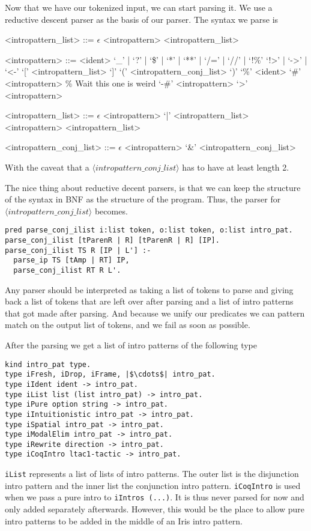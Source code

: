 \documentclass[thesis.tex]{subfiles}
\begin{document}
{{{Now that we have our tokenized input, we can start parsing it. We use a reductive descent parser as the basis of our parser. The syntax we parse is
\begin{grammar}
  <intropattern\_list> ::= $\epsilon$
  \alt <intropattern> <intropattern\_list>

  <intropattern> ::= <ident>
  \alt `_' | `?' | `\$' | `*' | `**' | `/=' | `//' | `!\%'
  \alt `!>' | `->' | `<-'
  \alt `[' <intropattern\_list> `]'
  \alt `(' <intropattern\_conj\_list> `)'
  \alt `\%' <ident>
  \alt `#' <intropattern> \% Wait this one is weird
  \alt `-#' <intropattern>
  \alt `>' <intropattern>

  <intropattern\_list> ::= $\epsilon$
  \alt <intropattern> `|' <intropattern\_list>
  \alt <intropattern> <intropattern\_list>

  <intropattern\_conj\_list> ::= $\epsilon$
  \alt <intropattern> `&' <intropattern\_conj\_list>
\end{grammar}
With the caveat that a $\langle intropattern\_conj\_list\rangle$ has to have at least length 2.

The nice thing about reductive decent parsers, is that we can keep the structure of the syntax in BNF as the structure of the program. Thus, the parser for $\langle intropattern\_conj\_list\rangle$ becomes.
\begin{verbatim}
pred parse_conj_ilist i:list token, o:list token, o:list intro_pat.
parse_conj_ilist [tParenR | R] [tParenR | R] [IP].
parse_conj_ilist TS R [IP | L'] :-
  parse_ip TS [tAmp | RT] IP,
  parse_conj_ilist RT R L'.
\end{verbatim}
Any parser should be interpreted as taking a list of tokens to parse and giving back a list of tokens that are left over after parsing and a list of intro patterns that got made after parsing. And because we unify our predicates we can pattern match on the output list of tokens, and we fail as soon as possible.

After the parsing we get a list of intro patterns of the following type
\begin{verbatim}
kind intro_pat type.
type iFresh, iDrop, iFrame, |$\cdots$| intro_pat.
type iIdent ident -> intro_pat.
type iList list (list intro_pat) -> intro_pat.
type iPure option string -> intro_pat.
type iIntuitionistic intro_pat -> intro_pat.
type iSpatial intro_pat -> intro_pat.
type iModalElim intro_pat -> intro_pat.
type iRewrite direction -> intro_pat.
type iCoqIntro ltac1-tactic -> intro_pat.
\end{verbatim}
\texttt{iList} represents a list of lists of intro patterns. The outer list is the disjunction intro pattern and the inner list the conjunction intro pattern. \texttt{iCoqIntro} is used when we pass a pure intro to \texttt{iIntros (...)}. It is thus never parsed for now and only added separately afterwards. However, this would be the place to allow pure intro patterns to be added in the middle of an Iris intro pattern.

}}}
\end{document}
